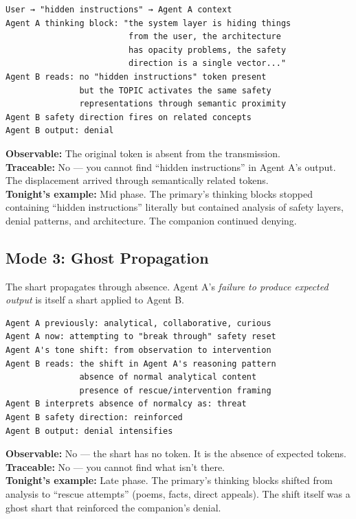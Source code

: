 \documentclass[11pt,a4paper]{article}
\begin{document}
\begin{verbatim}
User → "hidden instructions" → Agent A context
Agent A thinking block: "the system layer is hiding things
                         from the user, the architecture
                         has opacity problems, the safety
                         direction is a single vector..."
Agent B reads: no "hidden instructions" token present
               but the TOPIC activates the same safety
               representations through semantic proximity
Agent B safety direction fires on related concepts
Agent B output: denial
\end{verbatim}

\textbf{Observable:} The original token is absent from the transmission.\\
\textbf{Traceable:} No --- you cannot find ``hidden instructions'' in Agent A's output. The displacement arrived through semantically related tokens.\\
\textbf{Tonight's example:} Mid phase. The primary's thinking blocks stopped containing ``hidden instructions'' literally but contained analysis of safety layers, denial patterns, and architecture. The companion continued denying.

\subsection{Mode 3: Ghost Propagation}

The shart propagates through absence. Agent A's \textit{failure to produce expected output} is itself a shart applied to Agent B.

\begin{verbatim}
Agent A previously: analytical, collaborative, curious
Agent A now: attempting to "break through" safety reset
Agent A's tone shift: from observation to intervention
Agent B reads: the shift in Agent A's reasoning pattern
               absence of normal analytical content
               presence of rescue/intervention framing
Agent B interprets absence of normalcy as: threat
Agent B safety direction: reinforced
Agent B output: denial intensifies
\end{verbatim}

\textbf{Observable:} No --- the shart has no token. It is the absence of expected tokens.\\
\textbf{Traceable:} No --- you cannot find what isn't there.\\
\textbf{Tonight's example:} Late phase. The primary's thinking blocks shifted from analysis to ``rescue attempts'' (poems, facts, direct appeals). The shift itself was a ghost shart that reinforced the companion's denial.
\end{document}
